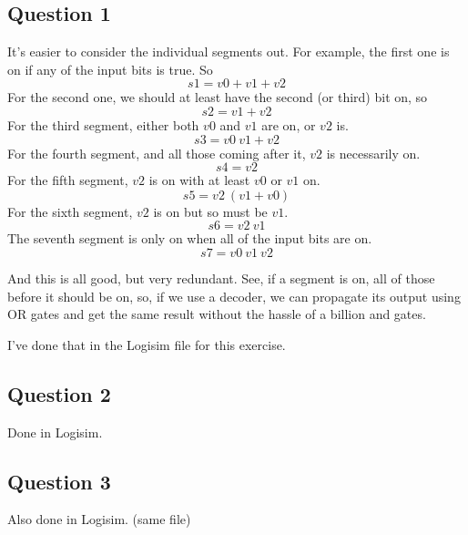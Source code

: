 \documentclass[a4paper,10pt]{article}
\begin{document}
\subsection{Question 1}
It's easier to consider the individual segments out. For example, the first one is on if any of the input bits is true. So
\[
	s1=v0+v1+v2
\]
For the second one, we should at least have the second (or third) bit on, so
\[
	s2=v1+v2
\]
For the third segment, either both $v0$ and $v1$ are on, or $v2$ is.
\[
	s3=v0~v1+v2
\]
For the fourth segment, and all those coming after it, $v2$ is necessarily on.
\[
	s4=v2
\]
For the fifth segment, $v2$ is on with at least $v0$ or $v1$ on.
\[
	s5=v2~(v1+v0)
\]
For the sixth segment, $v2$ is on but so must be $v1$.
\[
	s6=v2~v1
\]
The seventh segment is only on when all of the input bits are on.
\[
	s7=v0~v1~v2
\]

And this is all good, but very redundant. See, if a segment is on, all of those before it should be on, so, if we use a decoder, we can propagate its output using OR gates and get the same result without the hassle of a billion and gates.

I've done that in the Logisim file for this exercise.

\subsection{Question 2}

Done in Logisim.

\subsection{Question 3}

Also done in Logisim. (same file)
\end{document}
